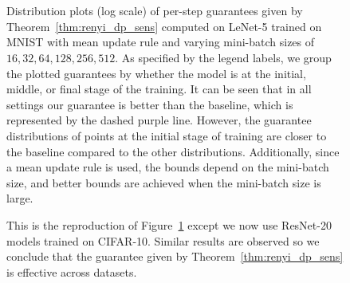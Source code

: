 \begin{figure}[t]
\centering
{}
\\
\\

\caption{Distribution plots (log scale) of per-step guarantees given by Theorem~\ref{thm:renyi_dp_sens} computed on LeNet-5 trained on MNIST with mean update rule and varying mini-batch sizes of $16, 32, 64, 128, 256, 512$. As specified by the legend labels, we group the plotted guarantees by whether the model is at the initial, middle, or final stage of the training. It can be seen that in all settings our guarantee is better than the baseline, which is represented by the dashed purple line. However, the guarantee distributions of points at the initial stage of training are closer to the baseline compared to the other distributions.
Additionally, since a mean update rule is used, the bounds depend on the mini-batch size, and better bounds are achieved when the mini-batch size is large. 
}
\label{fig:renyi_hard_eps_distrib_bs_mnist_mean}
\end{figure}


\begin{figure}[t]
\centering
{}


\caption{This is the reproduction of Figure~\ref{fig:renyi_hard_eps_distrib_bs_mnist_mean} except we now use ResNet-20 models trained on CIFAR-10. Similar results are observed so we conclude that the guarantee given by Theorem~\ref{thm:renyi_dp_sens} is effective across datasets.
}
\label{fig:renyi_hard_eps_distrib_bs_cifar_mean}
\end{figure}


